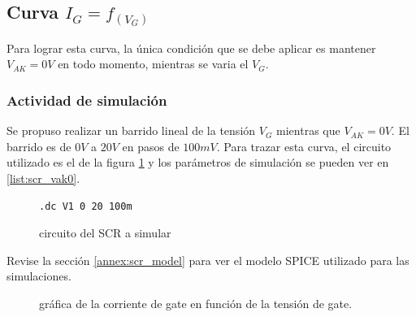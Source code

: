     \subsection{Curva $I_G = f_{(V_G)}$}
      Para lograr esta curva, la única condición que se debe aplicar es mantener $V_{AK} = 0V$ en todo momento,
      mientras se varia el $V_G$.

      \subsubsection{Actividad de simulación}
        Se propuso realizar un barrido lineal de la tensión $V_G$ mientras que $V_{AK} = 0V$. El barrido es de $0V$ a
        $20V$ en pasos de $100mV$. Para trazar esta curva, el circuito utilizado es el de la figura \ref{crkt:scr_vak0}
        y los parámetros de simulación se pueden ver en \ref{list:scr_vak0}.
        \begin{figure}[!ht]
          \centering
          \begin{minipage}{0.45\textwidth}
            \centering
            
            \caption{circuito del SCR a simular}
            \label{crkt:scr_vak0}
          \end{minipage}
          \hfill
          \begin{minipage}{0.45\textwidth}
            \centering
          \begin{lstlisting}[style=ltspice, caption={Parámetros de simulación LTspice}, label=list:scr_vak0]
.dc V1 0 20 100m
          \end{lstlisting}
          \end{minipage}
        \end{figure}

      Revise la sección \ref{annex:scr_model} para ver el modelo SPICE utilizado para las simulaciones.
      \begin{figure}[!ht]
          \caption{gráfica de la corriente de gate en función de la tensión de gate.}
          \label{graph:scr_ig_vg_vak0}
      \end{figure}

